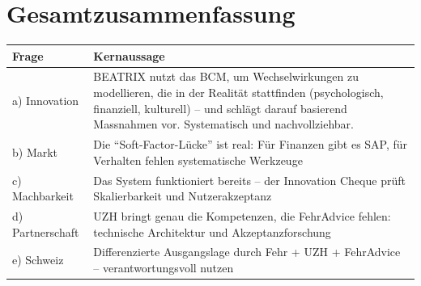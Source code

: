 \documentclass[11pt,a4paper]{article}
\begin{document}
\section*{Gesamtzusammenfassung}

\begin{table}[h]
\centering
\begin{tabular}{@{}L{3cm}L{10cm}@{}}
\toprule
\textbf{Frage} & \textbf{Kernaussage} \\
\midrule
a) Innovation & BEATRIX nutzt das BCM, um Wechselwirkungen zu modellieren, die in der Realität stattfinden (psychologisch, finanziell, kulturell) -- und schlägt darauf basierend Massnahmen vor. Systematisch und nachvollziehbar. \\
b) Markt & Die ``Soft-Factor-Lücke'' ist real: Für Finanzen gibt es SAP, für Verhalten fehlen systematische Werkzeuge \\
c) Machbarkeit & Das System funktioniert bereits -- der Innovation Cheque prüft Skalierbarkeit und Nutzerakzeptanz \\
d) Partnerschaft & UZH bringt genau die Kompetenzen, die FehrAdvice fehlen: technische Architektur und Akzeptanzforschung \\
e) Schweiz & Differenzierte Ausgangslage durch Fehr + UZH + FehrAdvice -- verantwortungsvoll nutzen \\
\bottomrule
\end{tabular}
\end{table}

\vspace{1cm}

\begin{center}
\end{center}

\newpage

\end{document}
